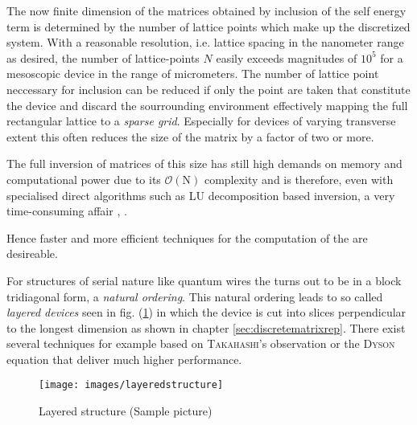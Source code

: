 The now finite dimension of the matrices obtained by inclusion of the self energy term is determined by the number of lattice points which make up the discretized system.
With a reasonable resolution, i.e. lattice spacing in the nanometer range as desired, the number of lattice-points $N$ easily exceeds magnitudes of $10^5$ for a mesoscopic device in the range of micrometers. 
The number of lattice point neccessary for inclusion can be reduced if only the point are taken that constitute the device and discard the sourrounding environment effectively mapping the full rectangular lattice to a \emph{sparse grid}. Especially for devices of varying transverse extent this often reduces the size of the matrix by a factor of two or more.\par
The full inversion of matrices of this size has still high demands on memory and computational power due to its $\mathcal{O}(\text{N})$ complexity and is therefore, even with specialised direct algorithms such as LU decomposition based inversion, a very time-consuming affair \cite{Datta2000.2.53}, \cite{Li2009Thesis}.\par
Hence faster and more efficient techniques for the computation of the \gfnc{} are desireable.\par
For structures of serial nature like quantum wires the \hamil{} turns out to be in a block tridiagonal form, a \emph{natural ordering}. This natural ordering leads to so called \emph{layered devices} seen in fig. (\ref{fig:layered}) in which the device is cut into slices perpendicular to the longest dimension as shown in chapter \ref{sec:discretematrixrep}. There exist several techniques for example based on \textsc{Takahashi}'s observation \cite{Takahashi1973} or the \textsc{Dyson} equation that deliver much higher performance.
\begin{figure}[h!]
\centering
\texttt{[image: images/layeredstructure]}
\caption{Layered structure (Sample picture)}
\label{fig:layered}
\end{figure}
